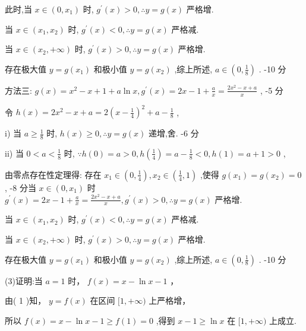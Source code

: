 \documentclass[10pt]{article}
\begin{document}
此时,当 \(x \in  \left( {0,{x}_{1}}\right)\) 时, \({g}^{\prime }\left( x\right)  > 0,\therefore y = g\left( x\right)\) 严格增.

当 \(x \in  \left( {{x}_{1},{x}_{2}}\right)\) 时, \({g}^{\prime }\left( x\right)  < 0,\therefore y = g\left( x\right)\) 严格减.

当 \(x \in  \left( {{x}_{2}, + \infty }\right)\) 时, \({g}^{\prime }\left( x\right)  > 0,\therefore y = g\left( x\right)\) 严格增.

存在极大值 \(y = g\left( {x}_{1}\right)\) 和极小值 \(y = g\left( {x}_{2}\right)\) ,综上所述, \(a \in  \left( {0,\frac{1}{8}}\right)\) . -10 分

方法三: \(g\left( x\right)  = {x}^{2} - x + 1 + a\ln x,{g}^{\prime }\left( x\right)  = {2x} - 1 + \frac{a}{x} = \frac{2{x}^{2} - x + a}{x}\) , -5 分

令 \(h\left( x\right)  = 2{x}^{2} - x + a = 2{\left( x - \frac{1}{4}\right) }^{2} + a - \frac{1}{8}\) ,

i) 当 \(a \geq  \frac{1}{8}\) 时, \(h\left( x\right)  \geq  0,\therefore y = g\left( x\right)\) 递增,舍. -6 分

ii) 当 \(0 < a < \frac{1}{8}\) 时, \(\because h\left( 0\right)  = a > 0,h\left( \frac{1}{4}\right)  = a - \frac{1}{8} < 0,h\left( 1\right)  = a + 1 > 0\) ,

由零点存在性定理得: 存在 \({x}_{1} \in  \left( {0,\frac{1}{4}}\right) ,{x}_{2} \in  \left( {\frac{1}{4},1}\right)\) ,使得 \(g\left( {x}_{1}\right)  = g\left( {x}_{2}\right)  = 0\) , -8 分当 \(x \in  \left( {0,{x}_{1}}\right)\) 时 \({g}^{\prime }\left( x\right)  = {2x} - 1 + \frac{a}{x} = \frac{2{x}^{2} - x + a}{x},{g}^{\prime }\left( x\right)  > 0,\therefore y = g\left( x\right)\) 严格增.

当 \(x \in  \left( {{x}_{1},{x}_{2}}\right)\) 时, \({g}^{\prime }\left( x\right)  < 0,\therefore y = g\left( x\right)\) 严格减.

当 \(x \in  \left( {{x}_{2}, + \infty }\right)\) 时, \({g}^{\prime }\left( x\right)  > 0,\therefore y = g\left( x\right)\) 严格增.

存在极大值 \(y = g\left( {x}_{1}\right)\) 和极小值 \(y = g\left( {x}_{2}\right)\) ,综上所述, \(a \in  \left( {0,\frac{1}{8}}\right)\) . -10 分

(3)证明:当 \(a = 1\) 时， \(f\left( x\right)  = x - \ln x - 1\) ，

由( 1 )知， \(y = f\left( x\right)\) 在区间 \(\lbrack 1, + \infty )\) 上严格增，

所以 \(f\left( x\right)  = x - \ln x - 1 \geq  f\left( 1\right)  = 0\) ,得到 \(x - 1 \geq  \ln x\) 在 \(\lbrack 1, + \infty )\) 上成立.
\end{document}
